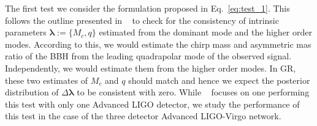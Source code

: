 \documentclass[prd,preprintnumbers,twocolumn,eqsecnum,floatfix,a4paper,nofootinbib,superscriptaddress]{revtex4}
\newcommand{\blambda}{\bm{\lambda}}
\begin{document}
The first test we consider the formulation proposed in Eq.~\eqref{eq:test_1}. This follows the outline presented in ~\cite{dhanpal2018} to check for the consistency of intrinsic parameters $\blambda := \{M_c, q\}$ estimated from the dominant mode and the higher order modes. According to this, we would estimate the chirp mass and asymmetric mas ratio of the BBH from the leading quadrapolar mode of the observed signal. Independently, we would estimate them from the higher order modes. In GR, these two estimates of $M_c$ and $q$ should match and hence we expect the posterior distribution of $\Delta \blambda $ to be consistent with zero. While ~\cite{dhanpal2018} focuses on one performing this test with only one Advanced LIGO detector, we study the performance of this test in the case of the three detector Advanced LIGO-Virgo network. 
\end{document}
